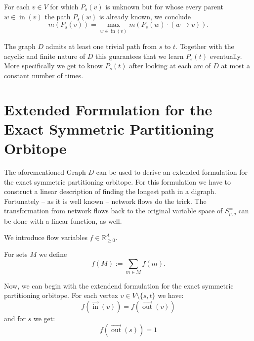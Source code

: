 \documentclass{amsart}
\theoremstyle{definition}
\DeclareMathOperator{\In}{in}
\DeclareMathOperator{\Out}{out}
\newcommand{\ina}{\ensuremath{\vec{\In}}}
\newcommand{\outa}{\ensuremath{\vec{\Out}}}
\newcommand{\inv}{\ensuremath{\dot{\In}}}
\begin{document}
For each \(v \in V\) for which \(P_s (v)\) is unknown but for whose
every parent \(w \in \inv(v)\) the path \(P_s (w)\) is already known,
we conclude
\[m\left(P_s \left(v\right)\right) = \max_{w \in \inv(v)}
m\left(P_s(w) \cdot \left(w \rightarrow v \right) \right)\text{.}\]

The graph \(D\) admits at least one trivial path from \(s\) to \(t\).
Together with the acyclic and finite nature of \(D\) this guarantees that we
learn \(P_s (t)\) eventually.  More specifically we get to know \(P_s
(t)\) after looking at each arc of \(D\) at most a constant number of
times.





\section{Extended Formulation for the Exact Symmetric Partitioning Orbitope}
The aforementioned Graph \(D\) can be used to derive an extended
formulation for the exact symmetric partitioning orbitope.  For this
formulation we have to construct a linear description of finding the
longest path in a digraph.  Fortunately -- as it is well known --
network flows do the trick.  The transformation from network flows
back to the original variable space of \(S^=_{p,q}\) can be done with
a linear function, as well.

We introduce flow variables \(f \in \mathbb{R}^A_{\geq 0}\).  

For sets \(M\) we define
\[f (M) := \sum_{m\in M} f(m)\text{.}\]

Now, we can begin with the extendend formulation for the exact
symmetric partitioning orbitope.  For each vertex \(v \in V \setminus
\{s,t\}\) we have:
\begin{equation}
f\left(\ina(v)\right) = f\left(\outa(v)\right)
\end{equation}
and for \(s\) we get:
\begin{equation}
f\left(\outa(s)\right) = 1
\end{equation}

\end{document}
